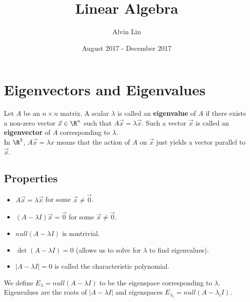\documentclass{math}
\title{Linear Algebra}
\author{Alvin Lin}
\date{August 2017 - December 2017}
\begin{document}
\maketitle

\section*{Eigenvectors and Eigenvalues}
Let \( A \) be an \( n\times n \) matrix. A scalar \( \lambda \) is called an
\textbf{eigenvalue} of \( A \) if there exists a non-zero vector \( \vec{x}\in
\R^n \) such that \( A\vec{x} = \lambda\vec{x} \). Such a vector \( \vec{x} \)
is called an \textbf{eigenvector} of \( A \) corresponding to \( \lambda \). \\
In \( \R^2 \), \( A\vec{x} = \lambda x \) means that the action of \( A \) on
\( \vec{x} \) just yields a vector parallel to \( \vec{x} \).

\subsection*{Properties}
\begin{itemize}
  \item \( A\vec{x} = \lambda\vec{x} \) for some \( \vec{x}\ne\vec{0} \).
  \item \( (A-\lambda I)\vec{x} = \vec{0} \) for some \( \vec{x}\ne\vec{0} \).
  \item \( null(A-\lambda I) \) is nontrivial.
  \item \( \det(A-\lambda I) = 0 \) (allows us to solve for \( \lambda \) to
  find eigenvalues).
  \item \( |A-\lambda I| = 0 \) is called the characteristic polynomial.
\end{itemize}
We define \( E_{\lambda} = null(A-\lambda I) \) to be the eigenspace
corresponding to \( \lambda \). Eigenvalues are the roots of \( |A-\lambda I| \)
and eigenspaces \( E_{\lambda_i} = null(A-\lambda_iI) \).
\end{document}
